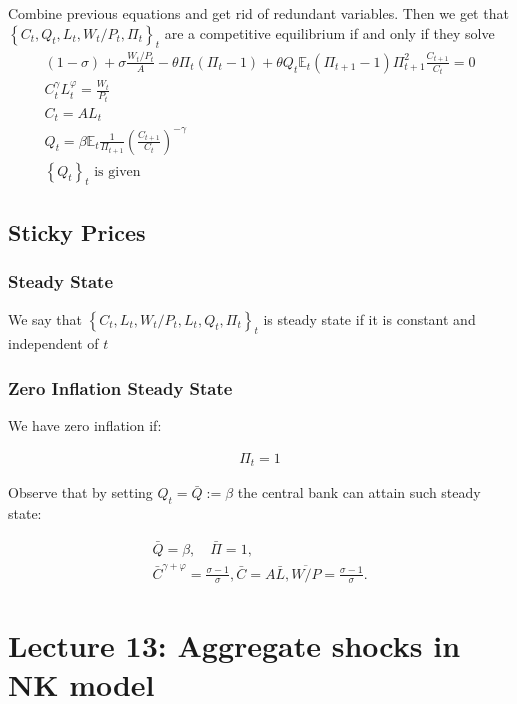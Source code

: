 \documentclass[10pt]{article}
\begin{document}
Combine previous equations and get rid of redundant variables. Then we get that 
$\left\{C_t, Q_t, L_t, W_t / P_t, \Pi_t\right\}_t$ are a competitive equilibrium if and only if they solve
$$
\begin{gathered}
(1-\sigma)+\sigma \frac{W_t / P_t}{A}-\theta \Pi_t\left(\Pi_t-1\right)+\theta Q_t \mathbb{E}_t\left(\Pi_{t+1}-1\right) \Pi_{t+1}^2 \frac{C_{t+1}}{C_t}=0 \\
C_t^\gamma L_t^{\varphi}=\frac{W_t}{P_t} \\
C_t=A L_t \\
Q_t=\beta \mathbb{E}_t \frac{1}{\Pi_{t+1}}\left(\frac{C_{t+1}}{C_t}\right)^{-\gamma} \\
\left\{Q_t\right\}_t \text { is given }
\end{gathered}
$$

\subsection{Sticky Prices}

\subsubsection{Steady State}

We say that 
$\left\{C_t, L_t, W_t / P_t, L_t, Q_t, \Pi_t\right\}_t$ 
is steady state if it is constant and 
independent of $t$

\subsubsection{Zero Inflation Steady State}

We have zero inflation if:

\begin{align}
    \Pi_t=1
\end{align}

Observe that by setting $Q_t=\bar{Q}:=\beta$ the central bank can attain such steady state:

$$
\begin{gathered}
\bar{Q}=\beta, \quad \bar{\Pi}=1, \\
\bar{C}^{\gamma+\varphi}=\frac{\sigma-1}{\sigma}, \bar{C}=A \bar{L}, \overline{W / P}=\frac{\sigma-1}{\sigma} .
\end{gathered}
$$


\section{Lecture 13: Aggregate shocks in NK model}
\end{document}
